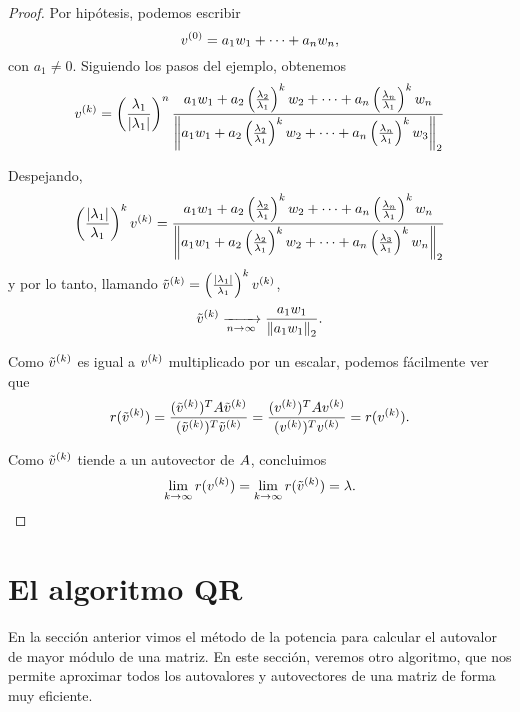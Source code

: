 \begin{proof}
Por hipótesis, podemos escribir
$$
\vb^{(0)} = a_1 \wb_1 + \dots + a_n \wb_n,
$$
con $a_1 \neq 0$.
Siguiendo los pasos del ejemplo, obtenemos
$$
\vb^{(k)} = \left(\frac{\lambda_1}{|\lambda_1|}\right)^n \frac{a_1 \wb_1 + a_2 \left(\frac{\lambda_2}{\lambda_1}\right)^k \wb_2 + \dots + a_n \left(\frac{\lambda_n}{\lambda_1}\right)^k \wb_n}{\left\|a_1 \wb_1 + a_2 \left(\frac{\lambda_2}{\lambda_1}\right)^k  \wb_2 + \dots + a_n \left(\frac{\lambda_n}{\lambda_1}\right)^k \wb_3\right\|_2}
$$

Despejando,
$$
\left(\frac{|\lambda_1|}{\lambda_1}\right)^k \vb^{(k)} = \frac{a_1 \wb_1 + a_2 \left(\frac{\lambda_2}{\lambda_1}\right)^k \wb_2 + \dots + a_n \left(\frac{\lambda_n}{\lambda_1}\right)^k \wb_n}{\left\|a_1 \wb_1 + a_2 \left(\frac{\lambda_2}{\lambda_1}\right)^k \wb_2 + \dots + a_n \left(\frac{\lambda_3}{\lambda_1}\right)^k \wb_n\right\|_2}
$$
y por lo tanto, llamando $\tilde \vb^{(k)} = \left(\frac{|\lambda_1|}{\lambda_1}\right)^k \vb^{(k)}$,
$$
\tilde \vb^{(k)} \xrightarrow[n \rightarrow \infty]{} \frac{a_1 \wb_1}{\left\|a_1 \wb_1\right\|_2}.
$$

Como $\tilde \vb^{(k)}$ es igual a $\vb^{(k)}$ multiplicado por un escalar, podemos fácilmente ver que
$$
r(\tilde \vb^{(k)}) = \frac{(\tilde \vb^{(k)})^T \Ab \tilde \vb^{(k)}}{(\tilde \vb^{(k)})^T  \tilde \vb^{(k)}} = \frac{(\vb^{(k)})^T \Ab \vb^{(k)}}{( \vb^{(k)})^T  \vb^{(k)}} = r(\vb^{(k)}).
$$


Como $\tilde \vb^{(k)}$ tiende a un autovector de $\Ab$, concluimos
$$
\lim_{k \rightarrow \infty} r(\vb^{(k)}) = \lim_{k \rightarrow \infty} r(\tilde \vb^{(k)}) = \lambda.
$$
\end{proof}



\section{El algoritmo QR}

En la sección anterior vimos el método de la potencia para calcular el autovalor de mayor módulo de una matriz. En este sección, veremos otro algoritmo, que nos permite aproximar todos los autovalores y autovectores de una matriz de forma muy eficiente.


